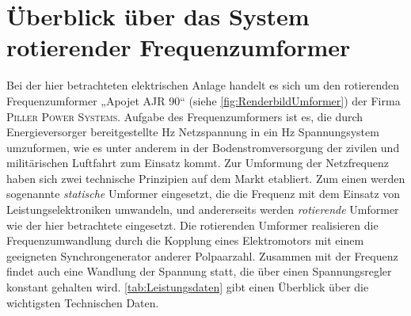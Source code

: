 \section{Überblick über das System rotierender Frequenzumformer}
\label{sec:Uberblick}
Bei der hier betrachteten elektrischen Anlage handelt es sich um den rotierenden Frequenzumformer „Apojet AJR 90“ (siehe \cref{fig:RenderbildUmformer}) der Firma \textsc{Piller Power Systems}. Aufgabe des Frequenzumformers ist es, die durch Energieversorger bereitgestellte \unit[50]{Hz} Netzspannung in ein \unit[400]{Hz} Spannungsystem umzuformen, wie es unter anderem in der Bodenstromversorgung der zivilen und militärischen Luftfahrt zum Einsatz kommt.
Zur Umformung der Netzfrequenz haben sich zwei technische Prinzipien auf dem Markt etabliert. Zum einen werden sogenannte \emph{statische} Umformer eingesetzt, die die Frequenz mit dem Einsatz von Leistungselektroniken umwandeln, und andererseits werden \emph{rotierende} Umformer wie der hier betrachtete eingesetzt. Die rotierenden Umformer realisieren die Frequenzumwandlung durch die Kopplung eines Elektromotors mit einem geeigneten Synchrongenerator anderer Polpaarzahl. Zusammen mit der Frequenz findet auch eine Wandlung der Spannung statt, die über einen Spannungsregler konstant gehalten wird. \cref{tab:Leistungsdaten} gibt einen Überblick über die wichtigsten Technischen Daten.

